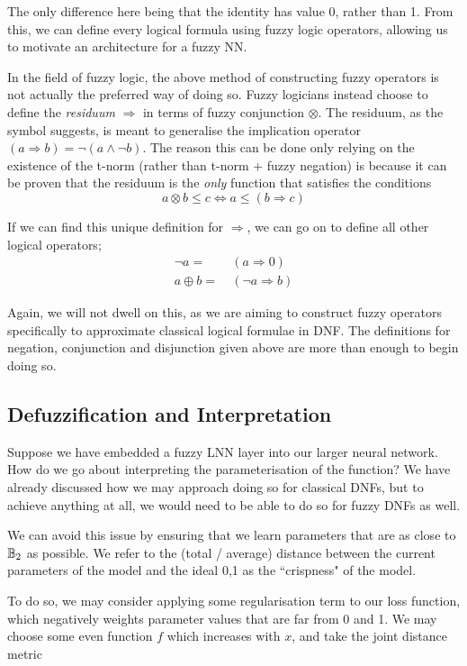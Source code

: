 \documentclass[conference]{report}
\begin{document}
The only difference here being that the identity has value 0, rather than 1. From this, we can define every logical formula using fuzzy logic operators, allowing us to motivate an architecture for a fuzzy NN.

In the field of fuzzy logic, the above method of constructing fuzzy operators is not actually the preferred way of doing so. Fuzzy logicians instead choose to define the \textit{residuum} $\Rightarrow$ in terms of fuzzy conjunction $\otimes$. The residuum, as the symbol suggests, is meant to generalise the implication operator $(a \Rightarrow b) = \lnot(a \land \lnot b)$. The reason this can be done only relying on the existence of the t-norm (rather than t-norm + fuzzy negation) is because it can be proven that the residuum is the \textit{only} function that satisfies the conditions
$$a \otimes b \leq c \iff a \leq (b \Rightarrow c)$$

If we can find this unique definition for $\Rightarrow$, we can go on to define all other logical operators;
$$
\begin{aligned}
\lnot a =&\ (a \Rightarrow 0) \\
a \oplus b =&\ (\lnot a \Rightarrow b)
\end{aligned}
$$

Again, we will not dwell on this, as we are aiming to construct fuzzy operators specifically to approximate classical logical formulae in DNF. The definitions for negation, conjunction and disjunction given above are more than enough to begin doing so.

\subsection{Defuzzification and Interpretation}

Suppose we have embedded a fuzzy LNN layer into our larger neural network. How do we go about interpreting the parameterisation of the function? We have already discussed how we may approach doing so for classical DNFs, but to achieve anything at all, we would need to be able to do so for fuzzy DNFs as well.

We can avoid this issue by ensuring that we learn parameters that are as close to $\mathbb{B}_2$ as possible. We refer to the (total / average) distance between the current parameters of the model and the ideal 0,1 as the ``crispness" of the model. 

To do so, we may consider applying some regularisation term to our loss function, which negatively weights parameter values that are far from 0 and 1. We may choose some even function $f$ which increases with $x$, and take the joint distance metric
\end{document}
